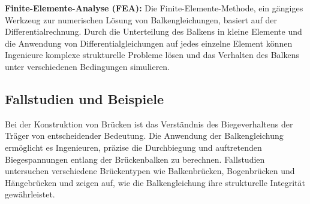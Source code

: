 \textbf{ Finite-Elemente-Analyse (FEA):}
Die Finite-Elemente-Methode, ein gängiges Werkzeug zur numerischen Lösung von Balkengleichungen, basiert auf der Differentialrechnung. 
Durch die Unterteilung des Balkens in kleine Elemente und die Anwendung von Differentialgleichungen auf jedes einzelne Element können Ingenieure komplexe strukturelle Probleme lösen und das Verhalten des Balkens unter verschiedenen Bedingungen simulieren.


\subsection{Fallstudien und Beispiele
\label{Fallstudien und Beispiele}}
Bei der Konstruktion von Brücken ist das Verständnis des Biegeverhaltens der Träger von entscheidender Bedeutung. 
Die Anwendung der Balkengleichung ermöglicht es Ingenieuren, präzise die Durchbiegung und auftretenden Biegespannungen entlang der Brückenbalken zu berechnen. 
Fallstudien untersuchen verschiedene Brückentypen wie Balkenbrücken, Bogenbrücken und Hängebrücken und zeigen auf, wie die Balkengleichung ihre strukturelle Integrität gewährleistet.

